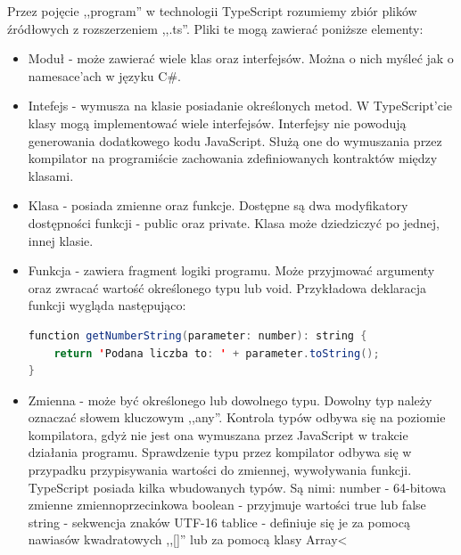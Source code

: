 Przez pojęcie ,,program'' w technologii TypeScript rozumiemy zbiór plików źródłowych z rozszerzeniem ,,.ts''. Pliki te mogą zawierać poniższe elementy:
\begin{itemize}
\item Moduł - może zawierać wiele klas oraz interfejsów. Można o nich myśleć jak o namesace'ach w języku C\#.
\item Intefejs - wymusza na klasie posiadanie określonych metod. W TypeScript'cie klasy mogą implementować wiele interfejsów. Interfejsy nie powodują generowania dodatkowego kodu JavaScript. Służą one do wymuszania przez kompilator na programiście zachowania zdefiniowanych kontraktów między klasami.
\item Klasa - posiada zmienne oraz funkcje. Dostępne są dwa modyfikatory dostępności funkcji - public oraz private. Klasa może dziedziczyć po jednej, innej klasie.
\item Funkcja - zawiera fragment logiki programu. Może przyjmować argumenty oraz zwracać wartość określonego typu lub void. Przykładowa deklaracja funkcji wygląda następująco:
\begin{lstlisting}[language=Java]
function getNumberString(parameter: number): string {
	return 'Podana liczba to: ' + parameter.toString();
}
\end{lstlisting}
\item Zmienna - może być określonego lub dowolnego typu. Dowolny typ należy oznaczać słowem kluczowym ,,any''. Kontrola typów odbywa się na poziomie kompilatora, gdyż nie jest ona wymuszana przez JavaScript w trakcie działania programu. Sprawdzenie typu przez kompilator odbywa się w przypadku przypisywania wartości do zmiennej, wywoływania funkcji. TypeScript posiada kilka wbudowanych typów. Są nimi:
\subitem number - 64-bitowa zmienne zmiennoprzecinkowa
\subitem boolean - przyjmuje wartości true lub false
\subitem string - sekwencja znaków UTF-16
\subitem tablice - definiuje się je za pomocą nawiasów kwadratowych ,,[]'' lub za pomocą klasy Array<
\end{itemize}

